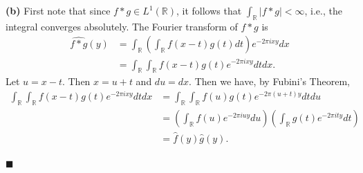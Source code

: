 \documentclass[12pt]{article}
\begin{document}
\noindent\textbf{(b)} First note that since $f*g\in L^1(\mathbb{R})$, it follows that $\int_{\mathbb{R}} |f*g| < \infty$, i.e., the integral converges absolutely. The Fourier transform of $f*g$ is
\begin{align}
    \widehat{f*g}(y) &= \int_{\mathbb{R}}\left(\int_{\mathbb{R}}f(x-t)g(t)dt\right)e^{-2\pi ixy}dx \\
    &= \int_\mathbb{R}\int_\mathbb{R} f(x-t)g(t)e^{-2\pi ixy}dtdx.
\end{align}
Let $u=x-t$. Then $x=u+t$ and $du=dx$. Then we have, by Fubini's Theorem,
\begin{align}
    \int_\mathbb{R}\int_\mathbb{R} f(x-t)g(t)e^{-2\pi ixy}dtdx &= \int_\mathbb{R}\int_\mathbb{R}f(u)g(t)e^{-2\pi(u+t)y}dtdu \\
    &= \left(\int_\mathbb{R}f(u)e^{-2\pi i uy}du\right)\left(\int_\mathbb{R}g(t)e^{-2\pi ity}dt\right) \\
    &= \hat{f}(y)\hat{g}(y).
\end{align}

\hfill$\blacksquare$

\vfill

\begin{center}
\\
\vspace{2mm}
\vspace{-0.65cm}
\hrulefill \\
\vspace{-0.95cm}
\hrulefill
\end{center}
\end{document}
